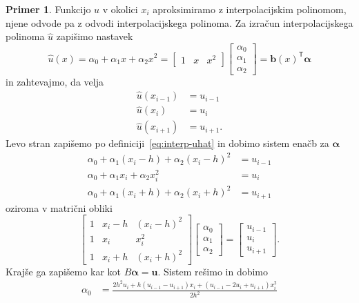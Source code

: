 \documentclass[12pt,a4paper,twoside]{article}
\theoremstyle{definition} %
\newtheorem{primer}[definicija]{Primer}
\theoremstyle{plain} %
\numberwithin{equation}{section}
\newcommand{\T}{\mathsf{T}}
\renewcommand{\b}{\boldsymbol}
\begin{document}
\begin{primer}
Funkcijo $u$ v okolici $x_i$ aproksimiramo z interpolacijskim polinomom, njene odvode pa z odvodi
interpolacijskega polinoma. Za izračun interpolacijskega polinoma $\hat{u}$ zapišimo nastavek
\begin{equation}
  \label{eq:interp-uhat}
  \hat{u}(x) = \alpha_0 + \alpha_1x + \alpha_2x^2 =
  \begin{bmatrix}
    1 & x & x^2
  \end{bmatrix}
  \begin{bmatrix}
    \alpha_0 \\ \alpha_1 \\ \alpha_2
  \end{bmatrix} = \b{b}(x)^\T\b{\alpha}
\end{equation}
in zahtevajmo, da velja
\begin{align}
  \hat{u}(x_{i-1}) &= u_{i-1} \\
  \hat{u}(x_{i}) &= u_{i} \\
  \hat{u}(x_{i+1}) &= u_{i+1}.
\end{align}
Levo stran zapišemo po definiciji~\eqref{eq:interp-uhat} in dobimo
sistem enačb za $\b\alpha$
\begin{align}
  \alpha_0 + \alpha_1 (x_i -h) + \alpha_2 (x_i-h)^2 &= u_{i-1} \\
  \alpha_0 + \alpha_1 x_{i} + \alpha_2 x_{i}^2 &= u_{i} \\
  \alpha_0 + \alpha_1 (x_i +h) + \alpha_2 (x_i+h)^2 &= u_{i+1}
\end{align}
oziroma v matrični obliki
\begin{equation}
  \begin{bmatrix}
    1 & x_i - h & (x_i-h)^2 \\
    1 & x_i & x_i^2 \\
    1 & x_i + h & (x_i+h)^2
  \end{bmatrix}
  \begin{bmatrix}
    \alpha_0 \\ \alpha_1 \\ \alpha_2
  \end{bmatrix}
  =
  \begin{bmatrix}
    u_{i-1} \\ u_i  \\ u_{i+1}
  \end{bmatrix}.
\end{equation}
Krajše ga zapišemo kar kot $B\b\alpha = \b{u}$. Sistem rešimo in dobimo
\begin{align}
  \alpha_0 &= \frac{2 h^2 u_{i}+h (u_{i-1}-u_{i+1}) x_i+(u_{i-1}-2 u_{i}+u_{i+1}) x_i^2}{2 h^2} \\

\end{align}
\end{primer}
\end{document}
